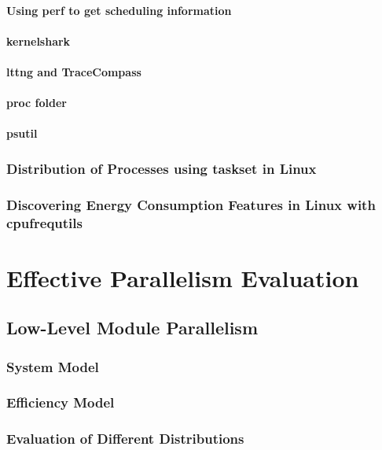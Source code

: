 \subsubsection{Using perf to get scheduling information}
\subsubsection{kernelshark}
\subsubsection{lttng and TraceCompass}
\subsubsection{proc folder}
\subsubsection{psutil}
\subsection{Distribution of Processes using taskset in Linux}
\subsection{Discovering Energy Consumption Features in Linux with cpufrequtils}


\chapter{Effective Parallelism Evaluation}
\section{Low-Level Module Parallelism} %
\subsection{System Model}
\subsection{Efficiency Model}
\subsection{Evaluation of Different Distributions}
